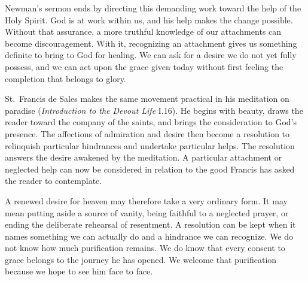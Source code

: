 Newman's sermon ends by directing this demanding work toward the help of the Holy Spirit. God is at work within us, and his help makes the change possible. Without that assurance, a more truthful knowledge of our attachments can become discouragement. With it, recognizing an attachment gives us something definite to bring to God for healing. We can ask for a desire we do not yet fully possess, and we can act upon the grace given today without first feeling the completion that belongs to glory.

St.~Francis de Sales makes the same movement practical in his meditation on paradise (\emph{Introduction to the Devout Life} I.16). He begins with beauty, draws the reader toward the company of the saints, and brings the consideration to God's presence. The affections of admiration and desire then become a resolution to relinquish particular hindrances and undertake particular helps. The resolution answers the desire awakened by the meditation. A particular attachment or neglected help can now be considered in relation to the good Francis has asked the reader to contemplate.

A renewed desire for heaven may therefore take a very ordinary form. It may mean putting aside a source of vanity, being faithful to a neglected prayer, or ending the deliberate rehearsal of resentment. A resolution can be kept when it names something we can actually do and a hindrance we can recognize. We do not know how much purification remains. We do know that every consent to grace belongs to the journey he has opened. We welcome that purification because we hope to see him face to face.

